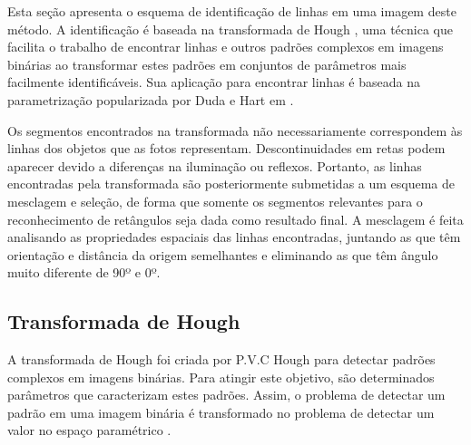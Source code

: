 
Esta seção apresenta o esquema de identificação de linhas em uma imagem deste método. A identificação é baseada na transformada de Hough \cite{houghintro00}, uma técnica que facilita o trabalho de encontrar linhas e outros padrões complexos em imagens binárias ao transformar estes padrões em conjuntos de parâmetros mais facilmente identificáveis. Sua aplicação para encontrar linhas é baseada na parametrização popularizada por Duda e Hart em \cite{houghintro02}.

Os segmentos encontrados na transformada não necessariamente correspondem às linhas dos objetos que as fotos representam. Descontinuidades em retas podem aparecer devido a diferenças na iluminação ou reflexos. Portanto, as linhas encontradas pela transformada são posteriormente submetidas a um esquema de  mesclagem e seleção, de forma que somente os segmentos relevantes para o reconhecimento de retângulos seja dada como resultado final. A mesclagem é feita analisando as propriedades espaciais das linhas encontradas, juntando as que têm orientação e distância da origem semelhantes e eliminando as que têm ângulo muito diferente de 90º e 0º.

\subsection{Transformada de Hough}


A transformada de Hough foi criada por P.V.C Hough para detectar padrões complexos em imagens binárias. Para atingir este objetivo, são determinados parâmetros que caracterizam estes padrões. Assim, o problema de detectar um padrão em uma imagem binária é transformado no problema de detectar um valor no espaço paramétrico \cite{houghintro01}.

